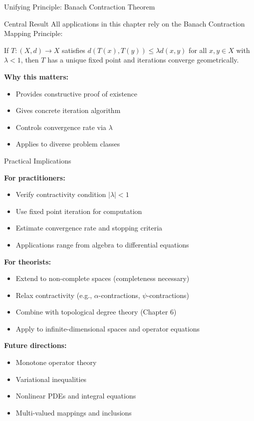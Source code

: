 \documentclass[aspectratio=169,10pt]{beamer}
\begin{document}
\begin{frame}{Unifying Principle: Banach Contraction Theorem}

\begin{block}{Central Result}
All applications in this chapter rely on the Banach Contraction Mapping Principle:

If $T : (X, d) \to X$ satisfies $d(T(x), T(y)) \leq \lambda d(x, y)$ for all $x, y \in X$ with $\lambda < 1$, then $T$ has a unique fixed point and iterations converge geometrically.
\end{block}

\vspace{1.5em}

\textbf{Why this matters:}
\begin{itemize}
  \item Provides constructive proof of existence
  \item Gives concrete iteration algorithm
  \item Controls convergence rate via $\lambda$
  \item Applies to diverse problem classes
\end{itemize}

\end{frame}

\begin{frame}{Practical Implications}

\textbf{For practitioners:}
\begin{itemize}
  \item Verify contractivity condition $|\lambda| < 1$
  \item Use fixed point iteration for computation
  \item Estimate convergence rate and stopping criteria
  \item Applications range from algebra to differential equations
\end{itemize}

\vspace{1.5em}

\textbf{For theorists:}
\begin{itemize}
  \item Extend to non-complete spaces (completeness necessary)
  \item Relax contractivity (e.g., $\alpha$-contractions, $\psi$-contractions)
  \item Combine with topological degree theory (Chapter 6)
  \item Apply to infinite-dimensional spaces and operator equations
\end{itemize}

\vspace{1.5em}

\textbf{Future directions:}
\begin{itemize}
  \item Monotone operator theory
  \item Variational inequalities
  \item Nonlinear PDEs and integral equations
  \item Multi-valued mappings and inclusions
\end{itemize}

\end{frame}
\end{document}
